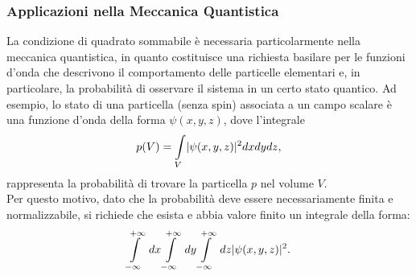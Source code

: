 \documentclass[12pt,oneside,openany]{memoir}
\numberwithin{equation}{subsection}
\DeclarePairedDelimiter{\abs}{\lvert}{\rvert}
\begin{document}
\subsubsection{Applicazioni nella Meccanica Quantistica}
La condizione di quadrato sommabile \`e necessaria particolarmente nella meccanica quantistica, in quanto costituisce una richiesta basilare per le funzioni d'onda che descrivono il comportamento delle particelle elementari e, in particolare, la probabilit\`a di osservare il sistema in un certo stato quantico. Ad esempio, lo stato di una particella (senza spin) associata a un campo scalare \`e una funzione d'onda della forma $\psi(x, y, z)$, dove l'integrale
\begin{equation}
	p(V) = \int\displaylimits_{V} \abs{\psi(x, y, z)}^2 dx dy dz,
\end{equation}
rappresenta la probabilit\`a di trovare la particella $p$ nel volume $V$.\\
Per questo motivo, dato che la probabilit\`a deve essere necessariamente finita e normalizzabile, si richiede che esista e abbia valore finito un integrale della forma:
\begin{equation}
	\int\displaylimits_{-\infty}^{+\infty} \ dx \int\displaylimits_{-\infty}^{+\infty} \ dy \int\displaylimits_{-\infty}^{+\infty} \ dz \abs{\psi(x, y, z)}^2.
\end{equation}

\newpage
\end{document}
